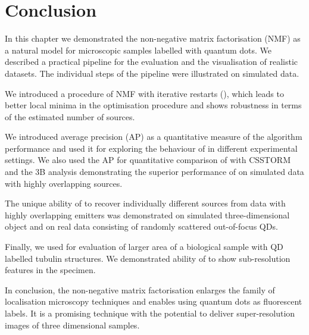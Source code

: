 \clearpage
\section{Conclusion\label{sec:Conclusion}}

In this chapter we demonstrated the non-negative matrix factorisation (NMF) as a natural model for microscopic samples labelled with quantum dots. We described a practical pipeline for the evaluation and the visualisation of realistic datasets. The individual steps of the pipeline were illustrated on simulated data.

We introduced a procedure of NMF with iterative restarts (\inmf{}), which leads to better local minima in the optimisation procedure and shows robustness in terms of the estimated number of sources. 

We introduced average precision (AP) as a quantitative measure  of the algorithm performance and used it for exploring the behaviour of \inmf{} in different experimental settings. We also used the AP for quantitative comparison of \inmf{} with CSSTORM and the 3B analysis demonstrating the superior performance of \inmf{} on simulated data with highly overlapping sources. 

The unique ability of \inmf{} to recover individually different sources from data with highly overlapping emitters was demonstrated on simulated three-dimensional object and on real data consisting of randomly scattered out-of-focus QDs. 

Finally, we used \inmf{} for evaluation of larger area of a biological sample with QD labelled tubulin structures. We demonstrated ability of  \inmf{} to show sub-resolution features in the specimen.

In conclusion, the non-negative matrix factorisation enlarges the family of localisation microscopy techniques and enables using quantum dots as fluorescent labels. It is a promising technique with the potential to deliver super-resolution images of three dimensional samples. 
